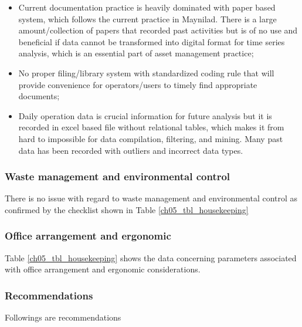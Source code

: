 \begin{itemize}
\item Current documentation practice is heavily dominated with paper based system, which follows the current practice in Maynilad. There is a large amount/collection of papers that recorded past activities but is of no use and beneficial if data cannot be transformed into digital format for time series analysis, which is an essential part of asset management practice;

\item No proper filing/library system with standardized coding rule that will provide convenience for operators/users to timely find appropriate documents;

\item Daily operation data is crucial information for future analysis but it is recorded in excel based file without relational tables, which makes it from hard to impossible for data compilation, filtering, and mining. Many past data has been recorded with outliers and incorrect data types. 

\end{itemize}

\subsubsection{Waste management and environmental control}
There is no issue with regard to waste management and environmental control as confirmed by the checklist shown in Table \ref{ch05_tbl_housekeeping}




\subsubsection{Office arrangement and ergonomic}
Table \ref{ch05_tbl_housekeeping} shows the data concerning parameters associated with office arrangement and ergonomic considerations.



\subsubsection{Recommendations}
Followings are recommendations

